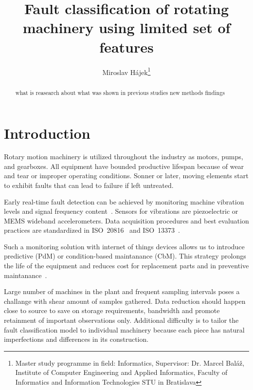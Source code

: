 \documentclass{llncs}
\begin{document}
\title{Fault classification of rotating machinery using limited set of features}

\author{
	Miroslav Hájek\thanks{Master study programme in field: Informatics,
	Supervisor: Dr. Marcel Baláž, Institute of Computer Engineering and Applied Informatics, Faculty of Informatics and Information Technologies STU in Bratislava}
}


\maketitle

\begin{abstract}
what is reasearch about
what was shown in previous studies
new methods
findings

\end{abstract}


\section{Introduction}
Rotary motion machinery is utilized throughout the industry as motors, pumps, and gearboxes. All equipment have bounded productive lifespan because of wear and tear or improper operating conditions. Sonner or later, moving elements start to exhibit faults that can lead to failure if left untreated. 

Early real-time fault detection can be achieved by monitoring machine vibration levels and signal frequency content~\cite{ziaran_technicka_2013}. Sensors for vibrations are piezoelectric or MEMS wideband accelerometers. Data acquisition procedures and best evaluation practices are standardized in ISO~20816~\cite{noauthor_iso_2016} and ISO~13373~\cite{noauthor_iso_2002}. 

Such a monitoring solution with internet of things devices allows us to introduce predictive (PdM) or condition-based maintanance (CbM). This strategy prolongs the life of the equipment and reduces cost for replacement parts and in preventive maintanance~\cite{ziaran_technicka_2013}. 

Large number of machines in the plant and frequent sampling intervals poses a challange with shear amount of samples gathered. Data reduction should happen close to source to save on storage requirements, bandwidth and promote retainment of important observations only. Additional difficulty is to tailor the fault classification model to individual machinery because each piece has natural imperfections and differences in its construction. 
\end{document}
